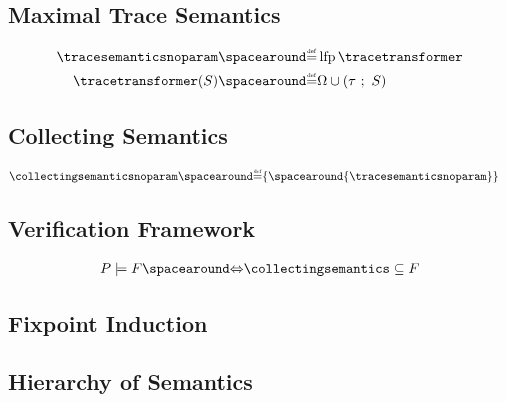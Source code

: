 \subsection{Maximal Trace Semantics}

\begin{definition}
  \begin{align*}
    \tracesemanticsnoparam &\DefeQ \lfp \tracetransformer \\
    \tracetransformer(\defsetoftraces) &\DefeQ \finalstates \setjoin (\mergesequences{\transitionrelation}{\defsetoftraces})
  \end{align*}
\end{definition}

\subsection{Collecting Semantics}

\begin{definition}
  \begin{align*}
    \collectingsemanticsnoparam &\DefeQ \{\spacearound{\tracesemanticsnoparam}\}
  \end{align*}

\end{definition}

\subsection{Verification Framework}

\begin{definition}[Validation]
  \begin{align*}
    \defprogram \satisfies \defproperty \IfF \collectingsemantics \subseteq \defproperty
  \end{align*}
\end{definition}

\subsection{Fixpoint Induction}

\subsection{Hierarchy of Semantics}

